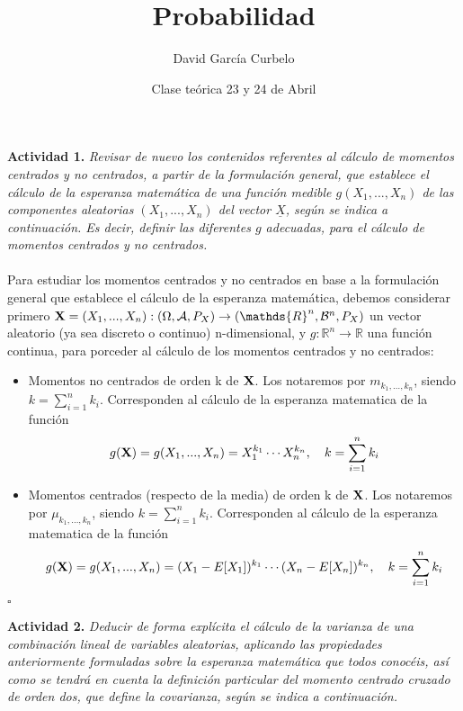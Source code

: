 \documentclass[a4paper, 12pt]{article}
\author{David García Curbelo}
\title{Probabilidad}
\date{Clase teórica 23 y 24 de Abril}
\newcommand*{\qed}{\hfill\ensuremath{\square}}
\def\R{\mathds{R}}
\begin{document}
    \maketitle
    \setcounter{page}{1}
    \pagestyle{plain}

    {\bf{Actividad 1.}} {\textit{Revisar de nuevo los contenidos referentes al cálculo de momentos centrados y no centrados, 
    a partir de la formulación general, que establece el cálculo de la esperanza matemática de una función medible 
    $g(X_1, . . . , X_n)$ de las componentes aleatorias $(X_1, . . . , X_n)$ del vector $\underline{X}$, según se indica a continuación. 
    Es decir, definir las diferentes $g$ adecuadas, para el cálculo de momentos centrados y no centrados.}}\\ \\

    Para estudiar los momentos centrados y no centrados en base  a la formulación general que establece el cálculo de la 
    esperanza matemática, debemos considerar primero ${\bf{X}} = (X_1, . . . , X_n) : (\Omega,\mathcal{A}, P_X) \rightarrow (\R ^n, \mathcal{B}^n, P_X)$
    un vector aleatorio (ya sea discreto o continuo) n-dimensional, y $g: \R ^n \rightarrow \R$ una función continua, para porceder al 
    cálculo de los momentos centrados y no centrados:

    \begin{itemize}
        \item Momentos no centrados de orden k de ${\bf{X}}$. Los notaremos por $m_{k_1,\dots,k_n}$, siendo $k=\sum _{i=1}^n k_i$.
            Corresponden al cálculo de la esperanza matematica de la función
            $$g({\bf{X}})=g(X_1, . . . , X_n)= X_1^{k_1}\cdots X_n^{k_n}, \quad k=\sum _{i=1}^n k_i$$   
        \item Momentos centrados (respecto de la media) de orden k de ${\bf{X}}$.  Los notaremos por $\mu_{k_1,\dots,k_n}$, 
            siendo $k=\sum _{i=1}^n k_i$. Corresponden al cálculo de la esperanza matematica de la función
            $$g({\bf{X}})=g(X_1, . . . , X_n)=(X_1 - E[X_1])^{k_1} \cdots (X_n - E[X_n])^{k_n}, \quad k=\sum _{i=1}^n k_i$$
    \end{itemize}
    \qed
    \newpage

    {\bf{Actividad 2.}} {\textit{Deducir de forma explícita el cálculo de la varianza de una combinación lineal de variables aleatorias, 
    aplicando las propiedades anteriormente formuladas sobre la esperanza matemática que todos conocéis, así como se tendrá en cuenta la 
    definición particular del momento centrado cruzado de orden dos, que define la covarianza, según se indica a continuación.}}
\end{document}
